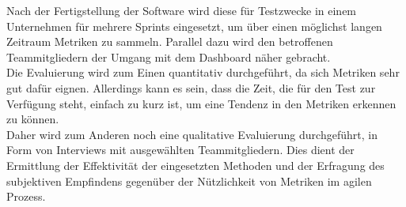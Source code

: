 Nach der Fertigstellung der Software wird diese für Testzwecke in einem Unternehmen für mehrere Sprints eingesetzt, um über einen möglichst langen Zeitraum Metriken zu sammeln.
Parallel dazu wird den betroffenen Teammitgliedern der Umgang mit dem Dashboard näher gebracht.
\\
Die Evaluierung wird zum Einen quantitativ durchgeführt, da sich Metriken sehr gut dafür eignen.
Allerdings kann es sein, dass die Zeit, die für den Test zur Verfügung steht, einfach zu kurz ist, um eine Tendenz in den Metriken erkennen zu können.
\\
Daher wird zum Anderen noch eine qualitative Evaluierung durchgeführt, in Form von Interviews mit ausgewählten Teammitgliedern.
Dies dient der Ermittlung der Effektivität der eingesetzten Methoden und der Erfragung des subjektiven Empfindens gegenüber der Nützlichkeit von Metriken im agilen Prozess.